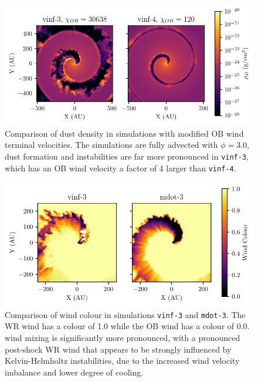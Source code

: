 \documentclass[fleqn,usenatbib]{mnras}
\begin{document}





\begin{figure}
  \centering
  \includegraphics[width=\linewidth]{assets/results/vinf/vinf-rhod.pdf}
  \caption[OB terminal velocity wind dust comparison]{Comparison of dust density in simulations with modified OB wind terminal velocities. The simulations are fully advected with $\phi = 3.0$, dust formation and instabilities are far more pronounced in \texttt{vinf-3}, which has an OB wind velocity a factor of 4 larger than \texttt{vinf-4}.}
  \label{fig:obvinfzcomp}
\end{figure}

\begin{figure}
  \centering
  \includegraphics[width=\linewidth]{assets/results/mixed/eta-004-comparison-r0.pdf}
  \caption[Wind colour comparison of $\eta = 0.04$ winds]{Comparison of wind colour in simulations \texttt{vinf-3} and \texttt{mdot-3}. The WR wind has a colour of 1.0 while the OB wind has a colour of 0.0. wind mixing is significantly more pronounced, with a pronounced post-shock WR wind that appears to be strongly influenced by Kelvin-Helmholtz instabilities, due to the increased wind velocity imbalance and lower degree of cooling.}
  \label{fig:eta004comparisoncolour}
\end{figure}
\end{document}
